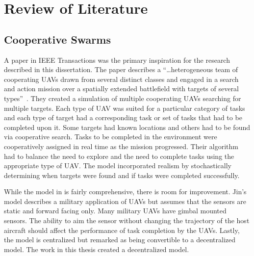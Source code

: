 \chapter{Review of Literature}
\label{chap:relWork}
\section{Cooperative Swarms}

A paper in IEEE Transactions was the primary inspiration for the research described in this dissertation.  The paper describes a ``\ldots heterogeneous team of cooperating UAVs drawn from several distinct classes and engaged in a search and action mission over a spatially extended battlefield with targets of several types''~\parencite[p.571]{jin}.  They created a simulation of multiple cooperating UAVs searching for multiple targets.  Each type of UAV was suited for a particular category of tasks and each type of target had a corresponding task or set of tasks that had to be completed upon it.  Some targets had known locations and others had to be found via cooperative search.  Tasks to be completed in the environment were cooperatively assigned in real time as the mission progressed.  Their algorithm had to balance the need to explore and the need to complete tasks using the appropriate type of UAV.  The model incorporated realism by stochastically determining when targets were found and if tasks were completed successfully.

While the model in \textcite{jin} is fairly comprehensive, there is room for improvement.  Jin's model describes a military application of UAVs but assumes that the sensors are static and forward facing only.  Many military UAVs have gimbal mounted sensors.  The ability to aim the sensor without changing the trajectory of the host aircraft should affect the performance of task completion by the UAVs.  Lastly, the model is centralized but remarked as being convertible to a decentralized model.  The work in this thesis created a decentralized model.


